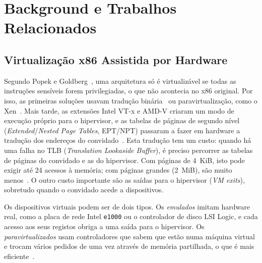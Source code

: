 \documentclass[conference]{IEEEtran}
\begin{document}
\section{Background e Trabalhos Relacionados}\label{sec_bg}

\subsection{Virtualização x86 Assistida por Hardware}
Segundo Popek e Goldberg~\cite{b7}, uma arquitetura só é virtualizável se todas as instruções sensíveis forem privilegiadas, o que não acontecia no x86 original. Por isso, as primeiras soluções usavam tradução binária~\cite{b9} ou paravirtualização, como o Xen~\cite{b8}. Mais tarde, as extensões Intel VT-x e AMD-V criaram um modo de execução próprio para o hipervisor, e as tabelas de páginas de segundo nível (\textit{Extended}/\textit{Nested Page Tables}, EPT/NPT) passaram a fazer em hardware a tradução dos endereços do convidado~\cite{b10}. Esta tradução tem um custo: quando há uma falha no TLB (\textit{Translation Lookaside Buffer}), é preciso percorrer as tabelas de páginas do convidado e as do hipervisor. Com páginas de 4~KiB, isto pode exigir até 24 acessos à memória; com páginas grandes (2~MiB), são muito menos~\cite{b10}. O outro custo importante são as saídas para o hipervisor (\textit{VM exits}), sobretudo quando o convidado acede a dispositivos.

Os dispositivos virtuais podem ser de dois tipos. Os \textit{emulados} imitam hardware real, como a placa de rede Intel \texttt{e1000} ou o controlador de disco LSI Logic, e cada acesso aos seus registos obriga a uma saída para o hipervisor. Os \textit{paravirtualizados} usam controladores que sabem que estão numa máquina virtual e trocam vários pedidos de uma vez através de memória partilhada, o que é mais eficiente~\cite{b8,b9}.
\end{document}
